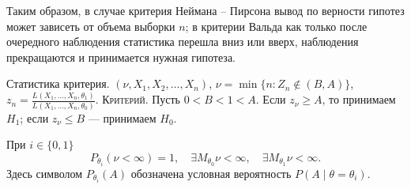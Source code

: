 Таким образом, в случае критерия Неймана -- Пирсона вывод по верности гипотез
может зависеть от объема выборки $ n $; в критерии Вальда как
только после очередного наблюдения статистика перешла вниз или вверх, наблюдения прекращаются и принимается нужная гипотеза.



Статистика критерия. $(\nu, X_1, X_2, \dots, X_n)$,
 $\nu = \min \{ n : Z_n \notin (B, A) \}$,
$z_n = \frac{L(X_1, \dots, X_n, \theta_1)}{L(X_1, \dots, X_n, \theta_0)}$.
\textsc{Критерий}. Пусть $0<B<1<A$.
Если $z_\nu \geqslant A$, то принимаем $H_1$; если $z_\nu \leqslant B$ --- принимаем $H_0$.

\begin{theorem}
  При $i \in \{ 0, 1 \}$
  \[
    P_{\theta_i}(\nu < \infty) = 1,\quad \exists M_{\theta_0} \nu < \infty,
    \quad \exists M_{\theta_1} \nu < \infty.
  \]
  Здесь символом $P_{\theta_i} (A)$ обозначена условная вероятность $P(A \mid
  \theta = \theta_i)$.
\end{theorem}

